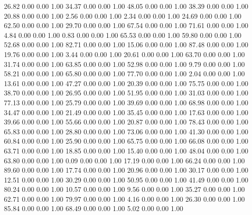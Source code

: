    26.82   0.00   0.00   1.00
   34.37   0.00   0.00   1.00
   48.05   0.00   0.00   1.00
   38.39   0.00   0.00   1.00
   20.88   0.00   0.00   1.00
    2.56   0.00   0.00   1.00
    2.34   0.00   0.00   1.00
   24.69   0.00   0.00   1.00
   62.50   0.00   0.00   1.00
   29.70   0.00   0.00   1.00
   67.54   0.00   0.00   1.00
   71.61   0.00   0.00   1.00
    4.84   0.00   0.00   1.00
    0.83   0.00   0.00   1.00
   65.53   0.00   0.00   1.00
   59.80   0.00   0.00   1.00
   52.68   0.00   0.00   1.00
   82.71   0.00   0.00   1.00
   15.06   0.00   0.00   1.00
   87.48   0.00   0.00   1.00
   19.76   0.00   0.00   1.00
    3.44   0.00   0.00   1.00
   20.61   0.00   0.00   1.00
   63.70   0.00   0.00   1.00
   31.74   0.00   0.00   1.00
   63.85   0.00   0.00   1.00
   52.98   0.00   0.00   1.00
    9.79   0.00   0.00   1.00
   58.21   0.00   0.00   1.00
   65.80   0.00   0.00   1.00
   77.70   0.00   0.00   1.00
    2.04   0.00   0.00   1.00
   13.61   0.00   0.00   1.00
   47.27   0.00   0.00   1.00
   20.39   0.00   0.00   1.00
   75.75   0.00   0.00   1.00
   38.70   0.00   0.00   1.00
   26.95   0.00   0.00   1.00
   51.95   0.00   0.00   1.00
   31.03   0.00   0.00   1.00
   77.13   0.00   0.00   1.00
   25.79   0.00   0.00   1.00
   39.69   0.00   0.00   1.00
   68.98   0.00   0.00   1.00
   34.47   0.00   0.00   1.00
   21.49   0.00   0.00   1.00
   35.45   0.00   0.00   1.00
   17.63   0.00   0.00   1.00
   39.66   0.00   0.00   1.00
   55.66   0.00   0.00   1.00
   20.87   0.00   0.00   1.00
   78.43   0.00   0.00   1.00
   65.83   0.00   0.00   1.00
   28.80   0.00   0.00   1.00
   73.06   0.00   0.00   1.00
   41.30   0.00   0.00   1.00
   60.84   0.00   0.00   1.00
   25.90   0.00   0.00   1.00
   65.75   0.00   0.00   1.00
   66.08   0.00   0.00   1.00
   63.71   0.00   0.00   1.00
   18.85   0.00   0.00   1.00
   15.40   0.00   0.00   1.00
   48.04   0.00   0.00   1.00
   63.80   0.00   0.00   1.00
    0.09   0.00   0.00   1.00
   17.19   0.00   0.00   1.00
   66.24   0.00   0.00   1.00
   89.60   0.00   0.00   1.00
   17.74   0.00   0.00   1.00
   20.96   0.00   0.00   1.00
   30.17   0.00   0.00   1.00
   12.51   0.00   0.00   1.00
   30.29   0.00   0.00   1.00
   50.95   0.00   0.00   1.00
   41.49   0.00   0.00   1.00
   80.24   0.00   0.00   1.00
   10.57   0.00   0.00   1.00
    9.56   0.00   0.00   1.00
   35.27   0.00   0.00   1.00
   62.71   0.00   0.00   1.00
   79.97   0.00   0.00   1.00
    4.16   0.00   0.00   1.00
   26.30   0.00   0.00   1.00
   85.84   0.00   0.00   1.00
   68.49   0.00   0.00   1.00
    5.02   0.00   0.00   1.00
